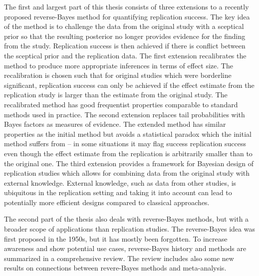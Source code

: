 The first and largest part of this thesis consists of three extensions to a
recently proposed reverse-Bayes method for quantifying replication success. The
key idea of the method is to challenge the data from the original study with a
sceptical prior so that the resulting posterior no longer provides evidence for
the finding from the study. Replication success is then achieved if there is
conflict between the sceptical prior and the replication data. The first
extension recalibrates the method to produce more appropriate inferences in
terms of effect size. The recalibration is chosen such that for original studies
which were borderline significant, replication success can only be achieved if
the effect estimate from the replication study is larger than the estimate from
the original study. The recalibrated method has good frequentist properties
comparable to standard methods used in practice. The second extension replaces
tail probabilities with Bayes factors as measures of evidence.
The extended method has similar properties as the initial method but avoids a
statistical paradox which the initial method suffers from -- in some situations
it may flag success replication success even though the effect estimate from the
replication is arbitrarily smaller than to the original one.
The third extension provides a framework for Bayesian design of replication
studies which allows for combining data from the original study with external
knowledge. External knowledge, such as data from other studies, is ubiquitous in
the replication setting and taking it into account can lead to potentially more
efficient designs compared to classical approaches.

The second part of the thesis also deals with reverse-Bayes methods, but with a
broader scope of applications than replication studies. The reverse-Bayes idea
was first proposed in the 1950s, but it has mostly been forgotten. To increase
awareness and show potential use cases, reverse-Bayes history and methods are
summarized in a comprehensive review. The review includes also some new results
on connections between revere-Bayes methods and meta-analysis. %

